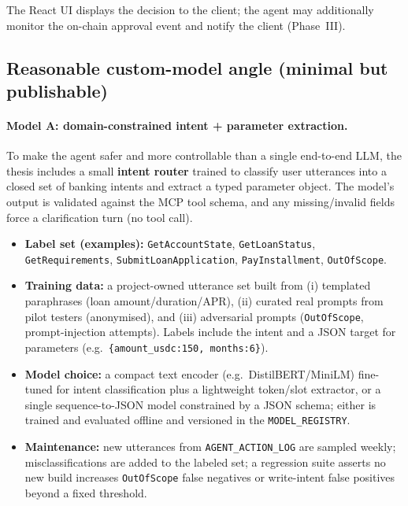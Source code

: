 \documentclass[12pt,a4paper]{report}
\begin{document}
\noindent The React UI displays the decision to the client; the agent may additionally monitor the on-chain approval event and notify the client (Phase~III).

\subsection{Reasonable custom-model angle (minimal but publishable)}
\label{sec:custom-model-angle}

\paragraph{Model A: domain-constrained intent + parameter extraction.}
To make the agent safer and more controllable than a single end-to-end LLM, the thesis includes a small \textbf{intent router} trained to classify user utterances into a closed set of banking intents and extract a typed parameter object. The model's output is validated against the MCP tool schema, and any missing/invalid fields force a clarification turn (no tool call).
\begin{itemize}[noitemsep]
  \item \textbf{Label set (examples):} \texttt{GetAccountState}, \texttt{GetLoanStatus}, \texttt{GetRequirements}, \texttt{SubmitLoanApplication}, \texttt{PayInstallment}, \texttt{OutOfScope}.
  \item \textbf{Training data:} a project-owned utterance set built from (i) templated paraphrases (loan amount/duration/APR), (ii) curated real prompts from pilot testers (anonymised), and (iii) adversarial prompts (\texttt{OutOfScope}, prompt-injection attempts). Labels include the intent and a JSON target for parameters (e.g.\ \texttt{\{amount\_usdc:150, months:6\}}).
  \item \textbf{Model choice:} a compact text encoder (e.g.\ DistilBERT/MiniLM) fine-tuned for intent classification plus a lightweight token/slot extractor, or a single sequence-to-JSON model constrained by a JSON schema; either is trained and evaluated offline and versioned in the \texttt{MODEL\_REGISTRY}.
  \item \textbf{Maintenance:} new utterances from \texttt{AGENT\_ACTION\_LOG} are sampled weekly; misclassifications are added to the labeled set; a regression suite asserts no new build increases \texttt{OutOfScope} false negatives or write-intent false positives beyond a fixed threshold.
\end{itemize}
\end{document}
